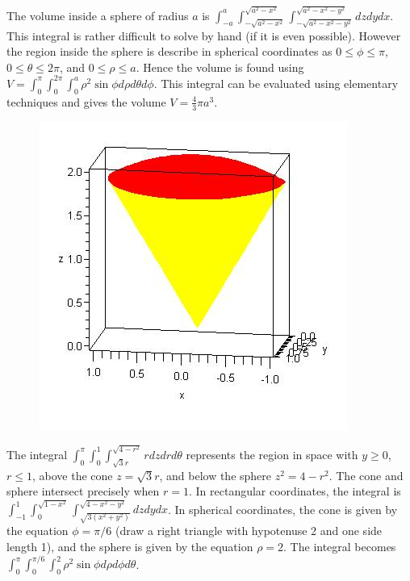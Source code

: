 The volume inside a sphere of radius $a$ is
$\int_{-a}^{a}\int_{-\sqrt{a^2-x^2}}^{\sqrt{a^2-x^2}}\int_{-\sqrt{a^2-x^2-y^2}}^{\sqrt{a^2-x^2-y^2}}dzdydx$.
This integral is rather difficult to solve by hand (if it is even
possible).  However the region inside the sphere is describe in
spherical coordinates as $0\leq \phi \leq \pi$, $0\leq \theta\leq 2\pi$, and $0\leq \rho\leq a$.  Hence
the volume is found using $V=\int_0^\pi\int_0^{2\pi}\int_0^a \rho^2\sin\phi d\rho d\theta d\phi$.
This integral can be evaluated using elementary techniques and gives
the volume $V=\frac{4}{3}\pi a^3$.


\begin{figure}
\newcommand{\myheight}{.8in}
\includegraphics[height=\myheight]{10-SurfaceTripleIntegrals/support/spherical-1}
\end{figure}
The integral $\int_{0}^{\pi}\int_{0}^{1}\int_{\sqrt{3}r}^{\sqrt{4-r^2}}rdzdrd\theta$
represents the region in space with $y\geq 0$, $r\leq 1$, above the cone
$z=\sqrt 3 r$, and below the sphere $z^2=4-r^2$. The cone and sphere
intersect precisely when $r=1$.  In rectangular coordinates, the
integral is
$\int_{-1}^{1}\int_{0}^{\sqrt{1-x^2}}\int_{\sqrt{3(x^2+y^2)}}^{\sqrt{4-x^2-y^2}}dzdydx$. 
In spherical coordinates, the cone is given by the equation $\phi=\pi/6$
(draw a right triangle with hypotenuse 2 and one side length 1), and
the sphere is given by the equation $\rho = 2$. The integral becomes
$\int_{0}^{\pi}\int_{0}^{\pi/6}\int_{0}^{2}\rho^2\sin\phi d\rho d\phi d\theta$. 









